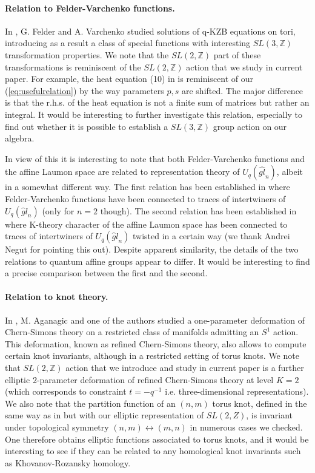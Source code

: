 \documentclass{amsart}
\begin{document}
\paragraph{\textbf{Relation to Felder-Varchenko functions.}} In \cite{FelderVarchenko'2001}, G. Felder and A. Varchenko studied solutions of q-KZB equations on tori, introducing as a result a class of special functions with interesting $SL(3,{\mathbb Z})$ transformation properties. We note that the $SL(2,{\mathbb Z})$ part of these transformations is reminiscent of the $SL(2,{\mathbb Z})$ action that we study in current paper. For example, the heat equation (10) in \cite{FelderVarchenko'2001} is reminiscent of our (\ref{eq:usefulrelation}) by the way parameters $p,s$ are shifted. The major difference is that the r.h.s. of the heat equation is not a finite sum of matrices but rather an integral. It would be interesting to further investigate this relation, especially to find out whether it is possible to establish a $SL(3,{\mathbb Z})$ group action on our algebra.

In view of this it is interesting to note that both Felder-Varchenko functions and the affine Laumon space are related to representation theory of $U_q( \widehat{gl}_n )$, albeit in a somewhat different way. The first relation has been established in \cite{Sun'2015} where Felder-Varchenko functions have been connected to traces of intertwiners of $U_q( {\hat gl}_n )$ (only for $n=2$ though). The second relation has been established in \cite{Negut'2011} where K-theory character of the affine Laumon space has been connected to traces of intertwiners of $U_q( {\hat gl}_n )$ twisted in a certain way (we thank Andrei Negut for pointing this out). Despite apparent similarity, the details of the two relations to quantum affine groups appear to differ. It would be interesting to find a precise comparison between the first and the second.

\paragraph{\textbf{Relation to knot theory.}} In \cite{AganagicShakirov'2015}, M. Aganagic and one of the authors studied a one-parameter deformation of Chern-Simons theory on a restricted class of manifolds admitting an $S^1$ action. This deformation, known as refined Chern-Simons theory, also allows to compute certain knot invariants, although in a restricted setting of torus knots. We note that $SL(2,{\mathbb Z})$ action that we introduce and study in current paper is a further elliptic 2-parameter deformation of refined Chern-Simons theory at level $K=2$ (which corresponds to constraint $t=-q^{-1}$ i.e. three-dimensional representations). We also note that the partition function of an $(n,m)$ torus knot, defined in the same way as in \cite{AganagicShakirov'2015} but with our elliptic representation of $SL(2,Z)$, is invariant under topological symmetry $(n,m) \leftrightarrow (m,n)$ in numerous cases we checked. One therefore obtains elliptic functions associated to torus knots, and it would be interesting to see if they can be related to any homological knot invariants such as Khovanov-Rozansky homology.
\end{document}

